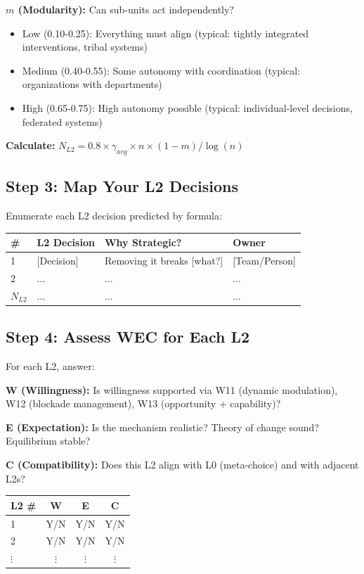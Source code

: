 \documentclass[11pt, a4paper]{article}
\begin{document}
\textbf{$m$ (Modularity):} Can sub-units act independently?
\begin{itemize}[nosep]
    \item Low (0.10-0.25): Everything must align (typical: tightly integrated interventions, tribal systems)
    \item Medium (0.40-0.55): Some autonomy with coordination (typical: organizations with departments)
    \item High (0.65-0.75): High autonomy possible (typical: individual-level decisions, federated systems)
\end{itemize}

\textbf{Calculate:} $N_{L2} = 0.8 \times \gamma_{avg} \times n \times (1-m) / \log(n)$

\subsection{Step 3: Map Your L2 Decisions} \label{sec:ch15-part5d}

Enumerate each L2 decision predicted by formula:

\begin{center}
\begin{tabular}{|l|l|l|l|}
\hline
\textbf{\#} & \textbf{L2 Decision} & \textbf{Why Strategic?} & \textbf{Owner} \\
\hline
1 & [Decision] & Removing it breaks [what?] & [Team/Person] \\
\hline
2 & ... & ... & ... \\
\hline
$N_{L2}$ & ... & ... & ... \\
\hline
\end{tabular}
\end{center}

\subsection{Step 4: Assess WEC for Each L2} \label{sec:ch15-part5e}

For each L2, answer:

\textbf{W (Willingness):} Is willingness supported via W11 (dynamic modulation), W12 (blockade management), W13 (opportunity + capability)?

\textbf{E (Expectation):} Is the mechanism realistic? Theory of change sound? Equilibrium stable?

\textbf{C (Compatibility):} Does this L2 align with L0 (meta-choice) and with adjacent L2s?

\begin{center}
\begin{tabular}{|l|c|c|c|}
\hline
\textbf{L2 \#} & \textbf{W} & \textbf{E} & \textbf{C} \\
\hline
1 & Y/N & Y/N & Y/N \\
\hline
2 & Y/N & Y/N & Y/N \\
\hline
$\vdots$ & $\vdots$ & $\vdots$ & $\vdots$ \\
\hline
\end{tabular}
\end{center}
\end{document}
